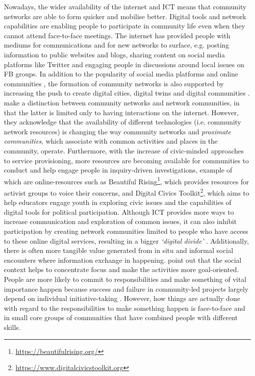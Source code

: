 Nowadays, the wider availability of the internet and ICT means that community networks are able to form quicker and mobilise better. Digital tools and network capabilities are enabling people to participate in community life even when they cannot attend face-to-face meetings. The internet has provided people with mediums for communications and for new networks to surface, e.g. posting information to public websites and blogs, sharing content on social media platforms like Twitter and engaging people in discussions around local issues on FB groups. In addition to the popularity of social media platforms and online communities \citep{crivellaro_pool_2014,afzalan_planning_2015}, the formation of community networks is also supported by increasing the push to create digital cities, digital twins \citep{bolton_gemini_2018} and digital communities \citep{carroll_strengthening_2018}. \citet{carroll_trajectory_2003} make a distinction between community networks and network communities, in that the latter is limited only to having interactions on the internet. However, they acknowledge that the availability of different technologies (i.e. community network resources) is changing the way community networks and \textit{proximate communities}, which associate with common activities and places in the community, operate. Furthermore, with the increase of civic-minded \citep{olivier_digital_2015,vlachokyriakos_digital_2016} approaches to service provisioning, more resources are becoming available for communities to conduct and help engage people in inquiry-driven investigations, example of which are online-resources such as Beautiful Rising\footnote{\url{https://beautifulrising.org/}}, which provides resources for activist groups to voice their concerns, and Digital Civics Toolkit\footnote{\url{https://www.digitalcivicstoolkit.org}}, which aims to help educators engage youth in exploring civic issues and the capabilities of digital tools for political participation. Although ICT provides more ways to increase communication and exploration of common issues, it can also inhibit participation by creating network communities limited to people who have access to these online digital services, resulting in a bigger \textit{`digital divide'} \citep{gurstein_effective_2003}. Additionally, there is often more tangible value generated from in situ and informal social encounters where information exchange in happening. \citet{carroll_trajectory_2003} point out that the social context helps to concentrate focus and make the activities more goal-oriented. People are more likely to commit to responsibilities and make something of vital importance happen because success and failure in community-led projects largely depend on individual initiative-taking \citep{carroll_participatory_2007}. However, how things are actually done with regard to the responsibilities to make something happen is face-to-face and in small core groups of communities that have combined people with different skills.
\newline

